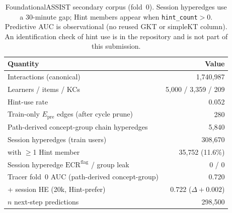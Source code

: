 \begin{table}[H]
\caption{FoundationalASSIST secondary corpus (fold~0). Session hyperedges use a
30-minute gap; Hint members appear when \texttt{hint\_count}$>0$. Predictive AUC
is observational (no reused GKT or simpleKT column). An identification
check of hint use is in the repository and is not part of this
submission.}
\label{tab:foundational-assist}
\centering
\begin{tabular}{@{}lr@{}}
\toprule
Quantity & Value \\
\midrule
Interactions (canonical) & 1{,}740{,}987 \\
Learners / items / KCs & 5{,}000 / 3{,}359 / 209 \\
Hint-use rate & 0.052 \\
Train-only $E_{\mathrm{pre}}$ edges (after cycle prune) & 280 \\
Path-derived concept-group chain hyperedges & 5{,}840 \\
Session hyperedges (train users) & 308{,}670 \\
\quad with $\ge$1 Hint member & 35{,}752 (11.6\%) \\
Session hyperedge $\mathrm{ECR}^{\mathrm{flag}}$ / group leak & 0 / 0 \\
Tracer fold~0 AUC (path-derived concept-group) & 0.720 \\
\quad + session HE (20k, Hint-prefer) & 0.722 ($\Delta{+}0.002$) \\
\quad $n$ next-step predictions & 298{,}500 \\
\bottomrule
\end{tabular}
\end{table}
